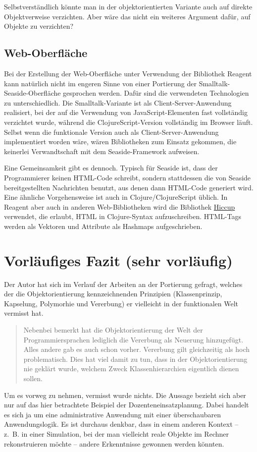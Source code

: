 \documentclass[11pt]{article}
\begin{document}
Selbstverständlich könnte man in der objektorientierten Variante auch
auf direkte Objektverweise verzichten. Aber wäre das nicht ein
weiteres Argument dafür, auf Objekte zu verzichten?

\subsection*{Web-Oberfläche}
\label{sec:orgd8a178f}
Bei der Erstellung der Web-Oberfläche unter Verwendung der Bibliothek
Reagent kann natürlich nicht im engeren Sinne von einer Portierung der
Smalltalk-Seaside-Oberfläche gesprochen werden. Dafür sind die
verwendeten Technologien zu unterschiedlich. Die
Smalltalk-Variante ist als Client-Server-Anwendung realisiert, bei der
auf die Verwendung von JavaScript-Elementen fast vollständig
verzichtet wurde, während die ClojureScript-Version vollständig
im Browser läuft. Selbst wenn die funktionale Version auch als
Client-Server-Anwendung implementiert worden wäre, wären Bibliotheken
zum Einsatz gekommen, die keinerlei Verwandtschaft mit dem
Seaside-Framework aufweisen. 

Eine Gemeinsamkeit gibt es dennoch. Typisch für Seaside ist, dass der
Programmierer keinen HTML-Code schreibt, sondern stattdessen die von
Seaside bereitgestellten Nachrichten benutzt, aus denen dann HTML-Code
generiert wird. Eine ähnliche Vorgehensweise ist auch in
Clojure/ClojureScript üblich. In Reagent aber auch in anderen
Web-Bibliotheken wird die Bibliothek \href{https://github.com/weavejester/hiccup}{Hiccup} verwendet, die erlaubt,
HTML in Clojure-Syntax aufzuschreiben. HTML-Tags werden als Vektoren
und Attribute als Hashmaps aufgeschrieben.

\section*{Vorläufiges Fazit (sehr vorläufig)}
\label{sec:org779759d}
Der Autor hat sich im Verlauf der Arbeiten an der Portierung gefragt,
welches der die Objektorientierung kennzeichnenden Prinzipien
(Klassenprinzip, Kapselung, Polymorhie und Vererbung) er vielleicht in
der funktionalen Welt vermisst hat.
\begin{quote}
Nebenbei bemerkt hat die Objektorientierung der Welt der
Programmiersprachen lediglich die Vererbung als Neuerung
hinzugefügt. Alles andere gab es auch schon vorher. Vererbung gilt
gleichzeitig als hoch problematisch. Dies hat viel damit zu tun, dass
in der Objektorientierung nie geklärt wurde, welchem Zweck
Klassenhierarchien eigentlich dienen sollen.
\end{quote}
Um es vorweg zu nehmen, vermisst wurde nichts. Die Aussage bezieht
sich aber nur auf das hier betrachtete Beispiel der
Dozenteneinsatzplanung. Dabei handelt es sich ja um eine
administrative Anwendung mit einer überschaubaren Anwendungslogik. Es
ist durchaus denkbar, dass in einem anderen Kontext -- z.~B. in
einer Simulation, bei der man vielleicht reale Objekte im Rechner
rekonstruieren möchte -- andere Erkenntnisse gewonnen werden könnten.
\end{document}
